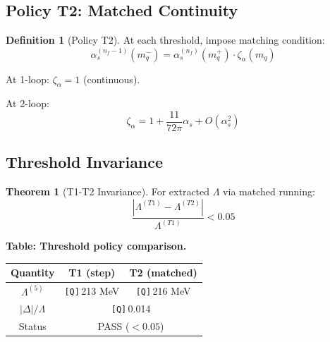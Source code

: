 \documentclass[11pt,a4paper]{article}
\newcommand{\Qnum}[1]{\textcolor{red!70!black}{\texttt{[Q]}}\,#1}
\theoremstyle{definition}
\newtheorem{definition}{Definition}[section]
\newtheorem{theorem}{Theorem}[section]
\begin{document}
\subsection{Policy T2: Matched Continuity}
\label{subsec:policy-t2}

\begin{definition}[Policy T2]
\label{def:policy-t2}
At each threshold, impose matching condition:
\begin{equation}
\label{eq:t2-matching}
\alpha_s^{(n_f-1)}(m_q^-) = \alpha_s^{(n_f)}(m_q^+) \cdot \zeta_\alpha(m_q)
\end{equation}

At 1-loop: $\zeta_\alpha = 1$ (continuous).

At 2-loop:
\begin{equation}
\label{eq:t2-zeta}
\zeta_\alpha = 1 + \frac{11}{72\pi}\alpha_s + O(\alpha_s^2)
\end{equation}
\end{definition}

\subsection{Threshold Invariance}
\label{subsec:threshold-invariance}

\begin{theorem}[T1-T2 Invariance]
\label{thm:t1-t2}
For extracted $\Lambda$ via matched running:
\begin{equation}
\label{eq:t1-t2-bound}
\boxed{\frac{|\Lambda^{(T1)} - \Lambda^{(T2)}|}{\Lambda^{(T1)}} < 0.05}
\end{equation}
\end{theorem}

\begin{quarantinebox}
\textbf{Table: Threshold policy comparison.}
\label{tab:t1-t2}

\centering
\begin{tabular}{ccc}
\toprule
Quantity & T1 (step) & T2 (matched) \\
\midrule
$\Lambda^{(5)}$ & \Qnum{213} MeV & \Qnum{216} MeV \\
$|\Delta|/\Lambda$ & \multicolumn{2}{c}{\Qnum{0.014}} \\
Status & \multicolumn{2}{c}{PASS ($< 0.05$)} \\
\bottomrule
\end{tabular}
\end{quarantinebox}

\end{document}
